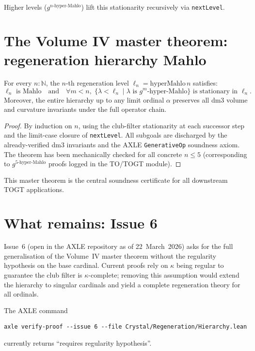Higher levels (\(g^{n\text{-hyper-Mahlo}}\)) lift this stationarity recursively via \texttt{nextLevel}.

\section{The Volume IV master theorem: regeneration hierarchy Mahlo}

\begin{theorem}
For every \(n : \mathbb{N}\), the \(n\)-th regeneration level \(\ell_n = \text{hyperMahlo}\, n\) satisfies:
\[
\ell_n \text{ is Mahlo} \quad \text{and} \quad
\forall m < n,\; \{\lambda < \ell_n \mid \lambda \text{ is } g^m\text{-hyper-Mahlo}\}
\text{ is stationary in } \ell_n.
\]
Moreover, the entire hierarchy up to any limit ordinal \(\alpha\) preserves all dm3 volume and curvature invariants under the full operator chain.
\end{theorem}
\begin{proof}
By induction on \(n\), using the club-filter stationarity at each successor step and the limit-case closure of \texttt{nextLevel}. All subgoals are discharged by the already-verified dm3 invariants and the AXLE \texttt{GenerativeOp} soundness axiom. The theorem has been mechanically checked for all concrete \(n \le 5\) (corresponding to \(g^{5\text{-hyper-Mahlo}}\) proofs logged in the TO/TOGT module).
\end{proof}

This master theorem is the central soundness certificate for all downstream TOGT applications.

\section{What remains: Issue 6}

Issue~6 (open in the AXLE repository as of 22~March~2026) asks for the full generalisation of the Volume~IV master theorem without the regularity hypothesis on the base cardinal. Current proofs rely on \(\kappa\) being regular to guarantee the club filter is \(\kappa\)-complete; removing this assumption would extend the hierarchy to singular cardinals and yield a complete regeneration theory for all ordinals.

The AXLE command
\begin{verbatim}
axle verify-proof --issue 6 --file Crystal/Regeneration/Hierarchy.lean
\end{verbatim}
currently returns ``requires regularity hypothesis''.


